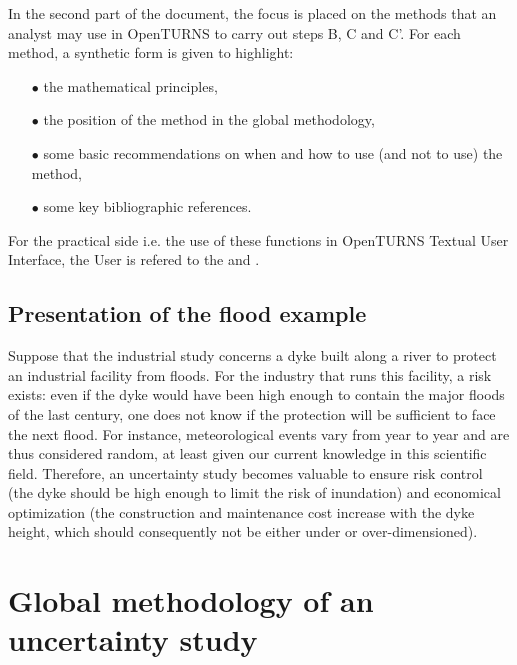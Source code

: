 In the second part of the document, the focus is placed on the methods that an analyst may use in OpenTURNS to carry out steps B, C and C'. For each method, a synthetic form is given to highlight:

\begin{itemize}

\item[$\bullet$] the mathematical principles,
\item[$\bullet$] the position of the method in the global methodology,
\item[$\bullet$] some basic recommendations on when and how to use (and not to use) the method,
\item[$\bullet$] some key bibliographic references.

\end{itemize}

For the practical side i.e. the use of these functions in OpenTURNS Textual User Interface, the User is refered to the   and .

\subsection{Presentation of the flood example}
\par

Suppose that the industrial study concerns a dyke built along a river to protect an industrial facility from floods. For the industry that runs this facility, a risk exists: even if the dyke would have been high enough to contain the major floods of the last century, one does not know if the protection will be sufficient to face the next flood. For instance, meteorological events vary from year to year and are thus considered random, at least given our current knowledge in this scientific field. Therefore, an uncertainty study becomes valuable to ensure risk control (the dyke should be high enough to limit the risk of inundation) and economical optimization (the construction and maintenance cost increase with the dyke height, which should consequently not be either under or over-dimensioned).

\newpage

\section{Global methodology of an uncertainty study}

